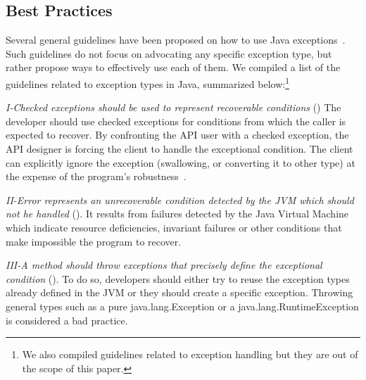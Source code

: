 \documentclass[conference]{IEEEtran}
\begin{document}
\subsection{Best Practices}
\label{sec:best}

Several general guidelines have been proposed on how to use Java
exceptions~\cite{mandrioli1992advances,gosling2000java,wirfs2006toward,
bloch2008effective}. Such guidelines do not focus on 
advocating any specific exception type, but rather propose ways to effectively use each of them.
 We compiled a list of the guidelines related to exception types in Java, 
summarized below:\footnote{We also compiled guidelines related
to exception handling but they are out of the scope of this paper.}


\emph{I-Checked exceptions should be used to represent recoverable
conditions} (\cite{mandrioli1992advances,gosling2000java,wirfs2006toward,bloch2008effective})
The developer should use checked exceptions for conditions from which the caller
is expected to recover. By confronting the API user with a checked exception,
the API designer is forcing the client to handle the exceptional condition. The
client can explicitly ignore the exception (swallowing, or converting it to
other type) at the expense of the program's robustness~\cite{gosling2000java}.

\emph{II-Error represents an unrecoverable condition detected by the JVM which
should not he handled} (\cite{gosling2000java}). It results from failures detected
by the Java Virtual Machine which indicate resource deficiencies, invariant
failures or other conditions that make impossible the program to recover.


\emph{III-A method should throw exceptions that precisely define the
exceptional condition} (\cite{gosling2000java,bloch2008effective}). To do so,
developers should either try to reuse the exception types already defined in the
JVM or they should create a specific exception. Throwing general types such as a
pure java.lang.Exception or a java.lang.RuntimeException is considered a bad practice.

\end{document}
